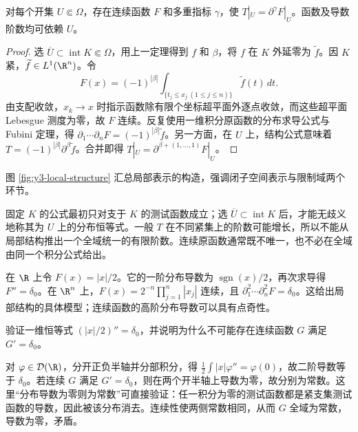 \begin{corollary}[局部为连续函数的分布导数]\label{cor:y3-continuous-primitive}
对每个开集 $U\Subset\Omega$，存在连续函数 $F$ 和多重指标 $\gamma$，使 $T|_U=\partial^\gamma F|_U$。函数及导数阶数均可依赖 $U$。
\end{corollary}
\begin{proof}
选 $\overline U\subset\operatorname{int}K\Subset\Omega$，用上一定理得到 $f$ 和 $\beta$，将 $f$ 在 $K$ 外延零为 $\widetilde f$。因 $K$ 紧，$\widetilde f\in L^1(\R^n)$。令
\[
 F(x)=(-1)^{|\beta|}\int_{\{t_j\le x_j\ (1\le j\le n)\}}
 \widetilde f(t)\,dt.
\]
由支配收敛，$x_k\to x$ 时指示函数除有限个坐标超平面外逐点收敛，而这些超平面 Lebesgue 测度为零，故 $F$ 连续。反复使用一维积分原函数的分布求导公式与 Fubini 定理，得 $\partial_1\cdots\partial_nF=(-1)^{|\beta|}\widetilde f$。另一方面，在 $U$ 上，结构公式意味着 $T=(-1)^{|\beta|}\partial^\beta\widetilde f$。合并即得 $T|_U=\partial^{\beta+(1,\ldots,1)}F|_U$。
\end{proof}

图 \ref{fig:y3-local-structure} 汇总局部表示的构造，强调闭子空间表示与限制域两个环节。



\begin{remark}[“局部”与表示的范围]
固定 $K$ 的公式最初只对支于 $K$ 的测试函数成立；选 $\overline U\subset\operatorname{int}K$ 后，才能无歧义地称其为 $U$ 上的分布恒等式。一般 $T$ 在不同紧集上的阶数可能增长，所以不能从局部结构推出一个全域统一的有限阶数。连续原函数通常既不唯一，也不必在全域由同一个积分公式给出。
\end{remark}

\begin{example}
在 $\R$ 上令 $F(x)=|x|/2$。它的一阶分布导数为 $\operatorname{sgn}(x)/2$，再次求导得 $F''=\delta_0$。在 $\R^n$ 上，$F(x)=2^{-n}\prod_{j=1}^n|x_j|$ 连续，且 $\partial_1^2\cdots\partial_n^2F=\delta_0$。这给出局部结构的具体模型；连续函数的高阶分布导数可以具有点奇性。
\end{example}

\begin{exercise}
验证一维恒等式 $(|x|/2)''=\delta_0$，并说明为什么不可能存在连续函数 $G$ 满足 $G'=\delta_0$。
\end{exercise}
\begin{solution}
对 $\varphi\in\Test(\R)$，分开正负半轴并分部积分，得 $\frac12\int|x|\varphi''=\varphi(0)$，故二阶导数等于 $\delta_0$。若连续 $G$ 满足 $G'=\delta_0$，则在两个开半轴上导数为零，故分别为常数。这里“分布导数为零则为常数”可直接验证：任一积分为零的测试函数都是紧支集测试函数的导数，因此被该分布消去。连续性使两侧常数相同，从而 $G$ 全域为常数，导数为零，矛盾。
\end{solution}
